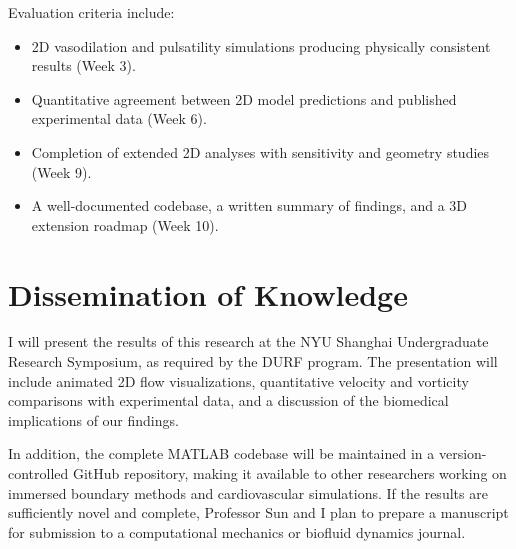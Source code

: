 \documentclass[12pt]{article}
\begin{document}
Evaluation criteria include:
\begin{itemize}[nosep]
    \item 2D vasodilation and pulsatility simulations producing physically consistent results (Week 3).
    \item Quantitative agreement between 2D model predictions and published experimental data (Week 6).
    \item Completion of extended 2D analyses with sensitivity and geometry studies (Week 9).
    \item A well-documented codebase, a written summary of findings, and a 3D extension roadmap (Week 10).
\end{itemize}

\section*{Dissemination of Knowledge}

I will present the results of this research at the NYU Shanghai Undergraduate Research Symposium, as required by the DURF program. The presentation will include animated 2D flow visualizations, quantitative velocity and vorticity comparisons with experimental data, and a discussion of the biomedical implications of our findings.

In addition, the complete MATLAB codebase will be maintained in a version-controlled GitHub repository, making it available to other researchers working on immersed boundary methods and cardiovascular simulations. If the results are sufficiently novel and complete, Professor Sun and I plan to prepare a manuscript for submission to a computational mechanics or biofluid dynamics journal.
\end{document}
